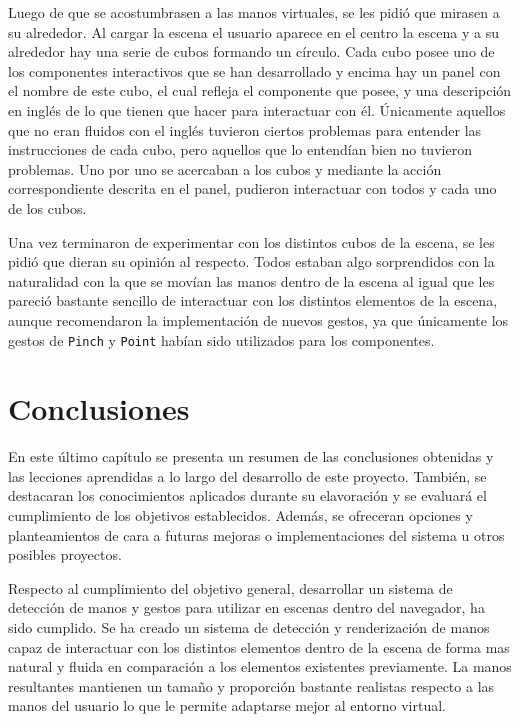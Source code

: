 \documentclass[a4paper, 12pt]{book}
\begin{document}
Luego de que se acostumbrasen a las manos virtuales, se les pidió que mirasen a su alrededor. Al cargar la escena el usuario aparece en el centro la escena y a su alrededor hay una serie de cubos formando un círculo. Cada cubo posee uno de los componentes interactivos que se han desarrollado y encima hay un panel con el nombre de este cubo, el cual refleja el componente que posee, y una descripción en inglés de lo que tienen que hacer para interactuar con él.
Únicamente aquellos que no eran fluidos con el inglés tuvieron ciertos problemas para entender las instrucciones de cada cubo, pero aquellos que lo entendían bien no tuvieron problemas. Uno por uno se acercaban a los cubos y mediante la acción correspondiente descrita en el panel, pudieron interactuar con todos y cada uno de los cubos. 

Una vez terminaron de experimentar con los distintos cubos de la escena, se les pidió que dieran su opinión al respecto. Todos estaban algo sorprendidos con la naturalidad con la que se movían las manos dentro de la escena al igual que les pareció bastante sencillo de interactuar con los distintos elementos de la escena, aunque recomendaron la implementación de nuevos gestos, ya que únicamente los gestos de \texttt{Pinch} y \texttt{Point} habían sido utilizados para los componentes.

\cleardoublepage
\chapter{Conclusiones}
\label{chap:conclusiones}
En este último capítulo se presenta un resumen de las conclusiones obtenidas y las lecciones aprendidas a lo largo del desarrollo de este proyecto. También, se destacaran los conocimientos aplicados durante su elavoración y se evaluará el cumplimiento de los objetivos establecidos. Además, se ofreceran opciones y planteamientos de cara a futuras mejoras o implementaciones del sistema u otros posibles proyectos.

Respecto al cumplimiento del objetivo general, desarrollar un sistema de detección de manos y gestos para utilizar en escenas dentro del navegador, ha sido cumplido. Se ha creado un sistema de detección y renderización de manos capaz de interactuar con los distintos elementos dentro de la escena de forma mas natural y fluida en comparación a los elementos existentes previamente. La manos resultantes mantienen un tamaño y proporción bastante realistas respecto a las manos del usuario lo que le permite adaptarse mejor al entorno virtual.
\end{document}
